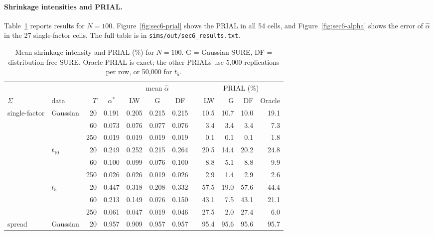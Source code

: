 \paragraph{Shrinkage intensities and PRIAL.} Table~\ref{tab:sec6-main} reports results for $N = 100$. Figure~\ref{fig:sec6-prial} shows the PRIAL in all 54 cells, and Figure~\ref{fig:sec6-alpha} shows the error of $\hat\alpha$ in the 27 single-factor cells. The full table is in \texttt{sims/out/sec6\_results.txt}.

\begin{table}[htbp]
  \centering
  \small
  \setlength{\tabcolsep}{4pt}
  \caption{Mean shrinkage intensity and PRIAL (\%) for $N = 100$. G = Gaussian SURE, DF = distribution-free SURE. Oracle PRIAL is exact; the other PRIALs use 5{,}000 replications per row, or 50{,}000 for $t_5$.}
  \label{tab:sec6-main}
  \begin{tabular}{llrcccccrrrr}
    \toprule
    & & & & \multicolumn{3}{c}{mean $\hat\alpha$} & & \multicolumn{4}{c}{PRIAL (\%)} \\
    \cmidrule(lr){5-7} \cmidrule(lr){9-12}
    $\Sigma$ & data & $T$ & $\alpha^*$ & LW & G & DF & & LW & G & DF & Oracle \\
    \midrule
    single-factor & Gaussian & 20  & 0.191 & 0.205 & 0.215 & 0.215 & & 10.5 & 10.7 & 10.0 & 19.1 \\
                  &          & 60  & 0.073 & 0.076 & 0.077 & 0.076 & & 3.4  & 3.4  & 3.4  & 7.3 \\
                  &          & 250 & 0.019 & 0.019 & 0.019 & 0.019 & & 0.1  & 0.1  & 0.1  & 1.8 \\
                  & $t_{10}$ & 20  & 0.249 & 0.252 & 0.215 & 0.264 & & 20.5 & 14.4 & 20.2 & 24.8 \\
                  &          & 60  & 0.100 & 0.099 & 0.076 & 0.100 & & 8.8  & 5.1  & 8.8  & 9.9 \\
                  &          & 250 & 0.026 & 0.026 & 0.019 & 0.026 & & 2.9  & 1.4  & 2.9  & 2.6 \\
                  & $t_5$    & 20  & 0.447 & 0.318 & 0.208 & 0.332 & & 57.5 & 19.0 & 57.6 & 44.4 \\
                  &          & 60  & 0.213 & 0.149 & 0.076 & 0.150 & & 43.1 & 7.5  & 43.1 & 21.1 \\
                  &          & 250 & 0.061 & 0.047 & 0.019 & 0.046 & & 27.5 & 2.0  & 27.4 & 6.0 \\
    \midrule
    spread        & Gaussian & 20  & 0.957 & 0.909 & 0.957 & 0.957 & & 95.4 & 95.6 & 95.6 & 95.7 \\

\end{tabular}
\end{table}
